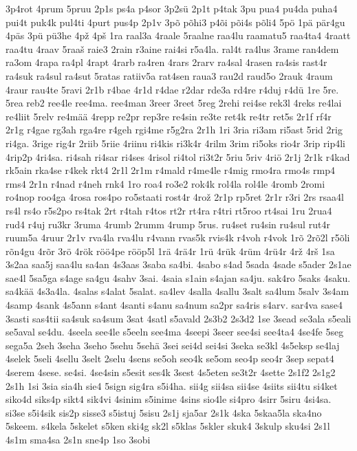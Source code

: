 {3p4rot
4prum
5pruu
2p1s
ps4a
p4sor
3p2sü
2p1t
p4tak
3pu
pua4
pu4da
puha4
pui4t
puk4k
pul4ti
4purt
pus4p
2p1v
3põ
põhi3
p4õi
põi4s
põli4
5pö
1pä
pär4gu
4päs
3pü
pü3he
4pž
4pš
1ra
raal3a
4raale
5raalne
raa4lu
raamatu5
raa4ta4
4raatt
raa4tu
4raav
5raaš
raie3
2rain
r3aine
rai4si
r5a4la.
ral4t
ra4lus
3rame
ran4dem
ra3om
4rapa
ra4pl
4rapt
4rarb
ra4ren
4rars
2rarv
ra4sal
4rasen
ra4sis
rast4r
ra4suk
ra4sul
ra4sut
5ratas
ratiiv5a
rat4sen
raua3
rau2d
raud5o
2rauk
4raum
4raur
rau4te
5ravi
2r1b
r4bae
4r1d
r4dae
r2dar
rde3a
rd4re
r4duj
r4dü
1re
5re.
5rea
reb2
ree4le
ree4ma.
ree4man
3reer
3reet
5reg
2rehi
rei4se
rek3l
4reks
re4lai
re4liit
5relv
re4mää
4repp
re2pr
rep3re
re4sin
re3te
ret4k
re4tr
ret5s
2r1f
rf4r
2r1g
r4gae
rg3ah
rga4re
r4geh
rgi4me
r5g2ra
2r1h
1ri
3ria
ri3am
ri5ast
5rid
2rig
ri4ga.
3rige
rig4r
2riib
5riie
4riinu
ri4kis
ri3k4r
4rilm
3rim
ri5oks
rio4r
3rip
rip4li
4rip2p
4ri4sa.
ri4sah
ri4sar
ri4ses
4risol
ri4tol
ri3t2r
5riu
5riv
4riö
2r1j
2r1k
r4kad
rk5ain
rka4se
r4kek
rkt4
2r1l
2r1m
r4mald
r4me4le
r4mig
rmo4ra
rmo4s
rmp4
rms4
2r1n
r4nad
r4neh
rnk4
1ro
roa4
ro3e2
rok4k
rol4la
rol4le
4romb
2romi
ro4nop
roo4ga
4rosa
ros4po
ro5staati
rost4r
4rož
2r1p
rp5ret
2r1r
r3ri
2rs
rsaa4l
rs4l
rs4o
r5s2po
rs4tak
2rt
r4tah
r4tos
rt2r
rt4ra
r4tri
rt5roo
rt4sai
1ru
2rua4
rud4
r4uj
ru3kr
3ruma
4rumb
2rumm
4rump
5rus.
ru4set
ru4sin
ru4sul
rut4r
ruum5a
4ruur
2r1v
rva4la
rva4lu
r4vann
rvas5k
rvis4k
r4voh
r4vok
1rõ
2rõ2l
r5õli
rõn4gu
4rõr
3rö
4rök
röö4pe
rööp5l
1rä
4rä4r
1rü
4rük
4rüm
4rü4r
4rž
4rš
1sa
3s2aa
saa5j
saa4lu
sa4an
4s3aas
3saba
sa4bi.
4sabo
s4ad
5sada
4sade
s5ader
2s1ae
sae4l
5sa5ga
s4age
sa4gu
4sahv
3sai.
4saia
s1ain
s4ajan
sa4ju.
sak4ro
5saks
4saku.
sa4kää
4s3a4la.
4salas
s4alat
5salat.
sa4lev
4salla
4sallu
3salt
sa4lum
5salv
3s4am
4samp
4sank
4s5ann
s4ant
4santi
s4anu
sa4num
sa2pr
sa4ris
s4arv.
sar4va
sase4
3sasti
sas4tii
sa4suk
sa4sum
3sat
4satl
s5avald
2s3b2
2s3d2
1se
3sead
se3ala
s5eali
se5aval
se4du.
4seela
see4le
s5eeln
see4ma
4seepi
3seer
see4si
see4ta4
4se4fe
5seg
sega5a
2seh
3seha
3seho
5sehu
5sehä
3sei
sei4d
sei4si
3seka
se3kl
4s5eksp
se4laj
4selek
5seli
4sellu
3selt
2selu
4sens
se5oh
seo4k
se5om
seo4p
seo4r
3sep
sepat4
4serem
4sese.
se4si.
4se4sin
s5esit
ses4k
3sest
4s5eten
se3t2r
4sette
2s1f2
2s1g2
2s1h
1si
3sia
sia4h
sie4
5sign
sig4ra
s5i4ha.
sii4g
sii4sa
sii4se
4siits
sii4tu
si4ket
siko4d
siks4p
sikt4
sik4vi
4sinim
s5inime
4sins
sio4le
si4pro
4sirr
5siru
4si4sa.
si3se
s5i4sik
sis2p
sisse3
s5istuj
5sisu
2s1j
sja5ar
2s1k
4ska
5skaa5la
ska4no
5skeem.
s4kela
5skelet
s5ken
ski4g
sk2l
s5klas
5skler
skuk4
3skulp
sku4si
2s1l
4s1m
sma4sa
2s1n
sne4p
1so
3sobi
}
